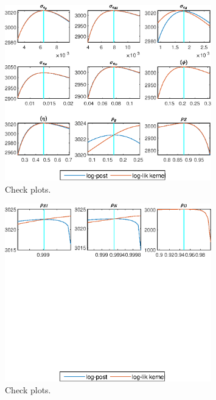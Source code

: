  
\begin{figure}[H]
\centering 
\includegraphics[width=0.80\textwidth]{BRS_growth_id/graphs/BRS_growth_id_CheckPlots1}
\caption{Check plots.}\label{Fig:CheckPlots:1}
\end{figure}
 
\begin{figure}[H]
\centering 
\includegraphics[width=0.80\textwidth]{BRS_growth_id/graphs/BRS_growth_id_CheckPlots2}
\caption{Check plots.}\label{Fig:CheckPlots:2}
\end{figure}
 
